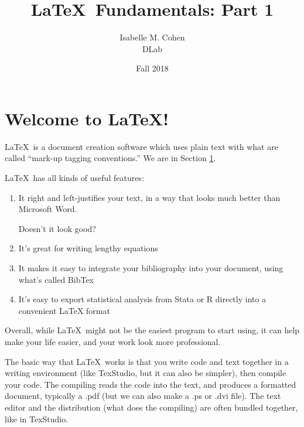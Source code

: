 \documentclass{article}
\title{\LaTeX\ Fundamentals: Part 1}
\date{Fall 2018} %
\author{Isabelle M. Cohen \\ DLab}
\begin{document}

\maketitle
\clearpage 
\tableofcontents
\clearpage

\section{Welcome to \LaTeX!}\label{welcome}

\LaTeX\  is a document creation software which uses plain text with what are called ``mark-up tagging conventions.'' We are in Section \ref{welcome}.



\LaTeX\  has all kinds of useful features:
\begin{enumerate}
	\item It right and left-justifies your text, in a way that looks much better than Microsoft Word. 
	
	Doesn't it look good?
	\item It's great for writing lengthy equations
	\item It makes it easy to integrate your bibliography into your document, using what's called BibTex
	\item It's easy to export statistical analysis from Stata or R directly into a convenient LaTeX format
\end{enumerate}

Overall, while \LaTeX\  might not be the easiest program to start using, it can help make your life easier, and your work look more professional.

The basic way that \LaTeX\ works is that you write code and text together in a writing environment (like TexStudio, but it can also be simpler), then compile your code. The compiling reads the code into the text, and produces a formatted document, typically a .pdf (but we can also make a .ps or .dvi file). The text editor and the distribution (what does the compiling) are often bundled together, like in TexStudio.
\end{document}
